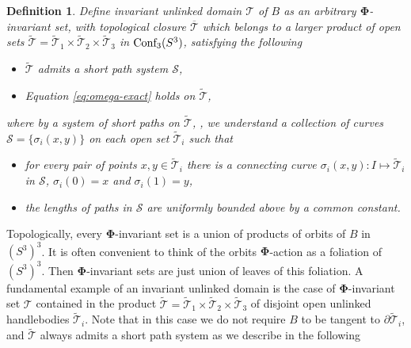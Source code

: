 \documentclass[12pt]{article}
\numberwithin{equation}{section}
\newtheorem{definition}[theorem]{Definition}
\newcommand{\Cnf}{\text{\rm Conf}}
\newcommand{\no}{\noindent}
\begin{document}
\begin{definition}

Define \emph{invariant unlinked domain} $\mathcal{T}$ of $B$ as an arbitrary $\mathbf{\Phi}$-invariant set, with topological closure $\overline{\mathcal{T}}$ which belongs to a larger product of open sets $\widetilde{\mathcal{T}}=\widetilde{\mathcal{T}}_1\times \widetilde{\mathcal{T}}_2\times \widetilde{\mathcal{T}}_3$
in $\Cnf_3(S^3)$, satisfying the following 
\begin{itemize}
\item[(A)] $\widetilde{\mathcal{T}}$ admits a \emph{short path system} $\mathcal{S}$,
\item[(B)] Equation \eqref{eq:omega-exact} holds on $\widetilde{\mathcal{T}}$,
\end{itemize}
\no where by a system of short paths on $\widetilde{\mathcal{T}}$, \cite{Vogel03, Khesin98}, we understand 
a collection of  curves $\mathcal{S}=\{\sigma_i(x,y)\}$ on each open set $\widetilde{\mathcal{T}}_i$ such that 
 
\begin{itemize}
\item[(a)] for every pair of points $x,y \in \widetilde{\mathcal{T}}_i$ there is a connecting curve $\sigma_i(x,y):I\mapsto \widetilde{\mathcal{T}}_i$ in $\mathcal{S}$, $\sigma_i(0)=x$ and $\sigma_i(1)=y$,
\item[(b)] the lengths of paths in $\mathcal{S}$ are uniformly 
bounded above by a common constant. 
\end{itemize}
\end{definition}

\no Topologically, every $\mathbf{\Phi}$-invariant 
set is a union of products of orbits of $B$ in $(S^3)^3$. It is often convenient to think of the 
orbits $\mathbf{\Phi}$-action as a foliation of $(S^3)^3$. Then $\mathbf{\Phi}$-invariant 
sets are just union of leaves of this foliation.  A fundamental example of an 
invariant unlinked domain is the case of $\mathbf{\Phi}$-invariant 
set $\mathcal{T}$ contained in the product $\widetilde{\mathcal{T}}=\widetilde{\mathcal{T}}_1\times \widetilde{\mathcal{T}}_2\times \widetilde{\mathcal{T}}_3$ of disjoint open unlinked handlebodies $\widetilde{\mathcal{T}}_i$. Note that in this case we do not require $B$ to be tangent to $\partial\widetilde{\mathcal{T}}_i$, and $\widetilde{\mathcal{T}}$ always admits a short path system as we describe in the following
\end{document}
